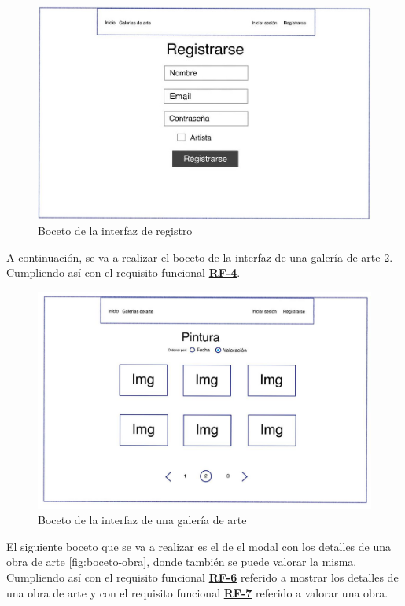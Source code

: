 \begin{figure}[H]
  \centering
  \includegraphics[width=\textwidth]{img/registrarse}
  \caption{Boceto de la interfaz de registro}
  \label{fig:boceto-registro}
\end{figure}

A continuación, se va a realizar el boceto de la interfaz de una galería de arte
\ref{fig:boceto-galeria}. Cumpliendo así con el requisito funcional
\hyperref[tab:rf-4]{\textbf{RF-4}}.

\begin{figure}[H]
  \centering
  \includegraphics[width=\textwidth]{img/galeria}
  \caption{Boceto de la interfaz de una galería de arte}
  \label{fig:boceto-galeria}
\end{figure}

El siguiente boceto que se va a realizar es el de el modal con los detalles de una obra de
arte \ref{fig:boceto-obra}, donde también se puede valorar la misma. Cumpliendo así con el
requisito funcional \hyperref[tab:rf-6]{\textbf{RF-6}} referido a mostrar los detalles de una
obra de arte y con el requisito funcional \hyperref[tab:rf-7]{\textbf{RF-7}} referido a
valorar una obra.

